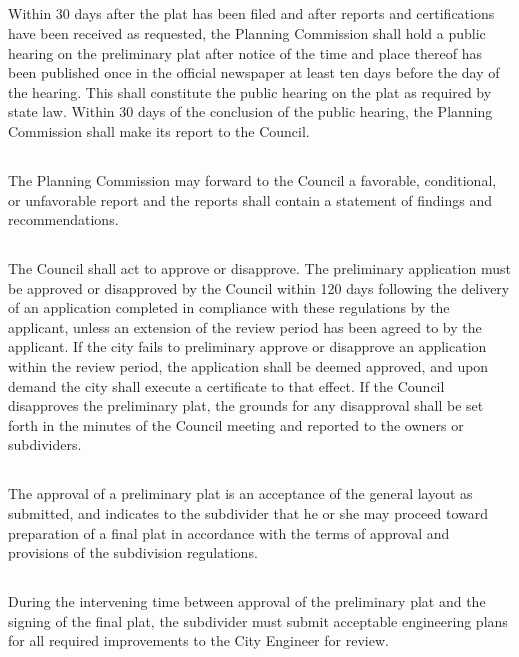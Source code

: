\subsection{}
Within 30 days after the plat has been filed and after reports and certifications have been received as requested, the Planning Commission shall hold a public hearing on the preliminary plat after notice of the time and place thereof has been published once in the official newspaper at least ten days before the day of the hearing. This shall constitute the public hearing on the plat as required by state law. Within 30 days of the conclusion of the public hearing, the Planning Commission shall make its report to the Council.
\subsection{}
The Planning Commission may forward to the Council a favorable, conditional, or unfavorable report and the reports shall contain a statement of findings and recommendations.
\subsection{}
The Council shall act to approve or disapprove. The preliminary application must be approved or disapproved by the Council within 120 days following the delivery of an application completed in compliance with these regulations by the applicant, unless an extension of the review period has been agreed to by the applicant. If the city fails to preliminary approve or disapprove an application within the review period, the application shall be deemed approved, and upon demand the city shall execute a certificate to that effect. If the Council disapproves the preliminary plat, the grounds for any disapproval shall be set forth in the minutes of the Council meeting and reported to the owners or subdividers.
\subsection{}
The approval of a preliminary plat is an acceptance of the general layout as submitted, and indicates to the subdivider that he or she may proceed toward preparation of a final plat in accordance with the terms of approval and provisions of the subdivision regulations.
\subsection{}
During the intervening time between approval of the preliminary plat and the signing of the final plat, the subdivider must submit acceptable engineering plans for all required improvements to the City Engineer for review.
